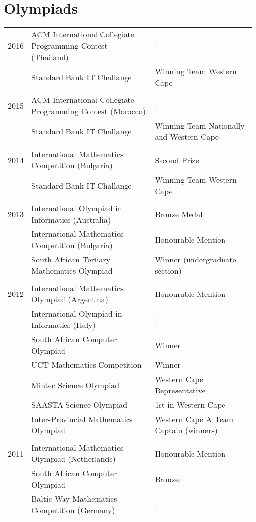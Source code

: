 \section{Olympiads}
\begin{tabular}{R{1cm}|ll}
2016 & ACM International Collegiate Programming Contest (Thailand)&|\\
& Standard Bank IT Challange & Winning Team Western Cape\\
&&\\
2015 & ACM International Collegiate Programming Contest (Morocco)&|\\
& Standard Bank IT Challange & Winning Team Nationally and Western Cape\\
 &&\\
  2014 & International Mathematics Competition (Bulgaria) & Second Prize\\
& Standard Bank IT Challange & Winning Team Western Cape\\
&&\\
2013 & International Olympiad in Informatics (Australia)& Bronze Medal\\
     & International Mathematics Competition (Bulgaria)& Honourable Mention\\
& South African Tertiary Mathematics Olympiad & Winner (undergraduate section)\\
&&\\
2012 & International Mathematics Olympiad (Argentina) & Honourable Mention\\
   & International Olympiad in Informatics (Italy)&|\\
& South African Computer Olympiad& Winner\\
& UCT Mathematics Competition & Winner\\
& Mintec Science Olympiad&Western Cape Representative\\
& SAASTA Science Olympiad&1st in Western Cape\\
& Inter-Provincial Mathematics Olympiad&Western Cape A Team Captain (winners)\\
&&\\
2011 & International Mathematics Olympiad (Netherlands)& Honourable Mention\\
& South African Computer Olympiad& Bronze\\
& Baltic Way Mathematics Competition (Germany) &|\\

\end{tabular}
